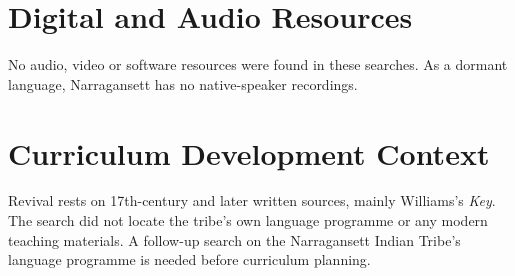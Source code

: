 \documentclass[12pt]{article}
\begin{document}
\section{Digital and Audio Resources}
No audio, video or software resources were found in these searches. As a dormant language, Narragansett has no native-speaker recordings.

\section{Curriculum Development Context}
Revival rests on 17th-century and later written sources, mainly Williams's \emph{Key}. The search did not locate the tribe's own language programme or any modern teaching materials. A follow-up search on the Narragansett Indian Tribe's language programme is needed before curriculum planning.
\end{document}
